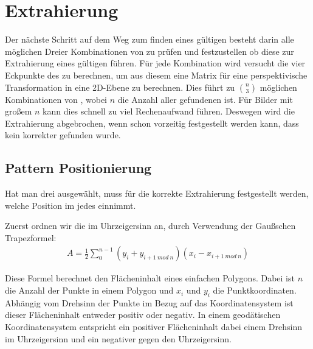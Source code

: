 \chapter{Extrahierung}

Der nächste Schritt auf dem Weg zum finden eines gültigen \QRCodes besteht darin alle möglichen Dreier Kombinationen von \fps zu prüfen und festzustellen ob diese zur Extrahierung eines gültigen \QRCodes führen. Für jede Kombination wird versucht die vier Eckpunkte des \QRCodes zu berechnen, um aus diesem eine Matrix für eine perspektivische Transformation in eine 2D-Ebene zu berechnen. Dies führt zu $\binom{n}{3}$ möglichen Kombinationen von \fps, wobei $n$ die Anzahl aller gefundenen \fps ist. Für Bilder mit großem $n$ kann dies schnell zu viel Rechenaufwand führen. Deswegen wird die Extrahierung abgebrochen, wenn schon vorzeitig festgestellt werden kann, dass kein korrekter \QRCode gefunden wurde.

\section{Pattern Positionierung}
Hat man drei \fps ausgewählt, muss für die korrekte Extrahierung festgestellt werden, welche Position im \QRCode jedes \fp einnimmt.
\begin{theorem}
Zuerst ordnen wir die \fps im Uhrzeigersinn an, durch Verwendung der Gaußschen Trapezformel: 
\begin{align}
A=\frac{1}{2} \sum_{0}^{n-1} (y_i + y_{i+1\ mod\ n})(x_i - x_{i+1\ mod\ n})
\end{align}
\end{theorem}
Diese Formel berechnet den Flächeninhalt eines einfachen Polygons. Dabei ist $n$ die Anzahl der Punkte in einem Polygon und $x_i$ und $y_i$ die Punktkoordinaten. Abhängig vom Drehsinn der Punkte im Bezug auf das Koordinatensystem ist dieser Flächeninhalt entweder positiv oder negativ. In einem geodätischen Koordinatensystem entspricht ein positiver Flächeninhalt dabei einem Drehsinn im Uhrzeigersinn und ein negativer gegen den Uhrzeigersinn.

